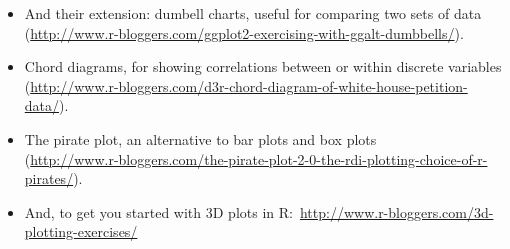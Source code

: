 \documentclass[a4paper]{article}
\begin{document}
\begin{itemize}
\begin{itemize}
            \item And their extension: dumbell charts, useful for comparing two sets of data (\url{http://www.r-bloggers.com/ggplot2-exercising-with-ggalt-dumbbells/}).\\
            \item Chord diagrams, for showing correlations between or within discrete variables (\url{http://www.r-bloggers.com/d3r-chord-diagram-of-white-house-petition-data/}).\\
            \item The pirate plot, an alternative to bar plots and box plots\\ (\url{http://www.r-bloggers.com/the-pirate-plot-2-0-the-rdi-plotting-choice-of-r-pirates/}).\\
            \item And, to get you started with 3D plots in R:\ \url{http://www.r-bloggers.com/3d-plotting-exercises/}
        \end{itemize}
    \end{itemize}
\end{document}
